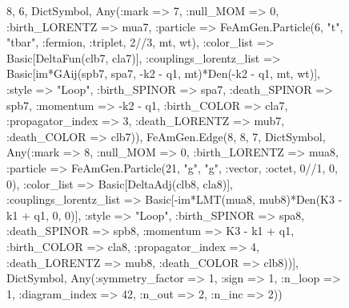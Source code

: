 \documentclass{revtex4}
\begin{document}
\begin{figure}[!htb]
\begin{center}
{8, 6, Dict{Symbol, Any}(:mark => 7, :null_MOM => 0, :birth_LORENTZ => mua7, :particle => FeAmGen.Particle(6, "t", "tbar", :fermion, :triplet, 2//3, mt, wt), :color_list => Basic[DeltaFun(clb7, cla7)], :couplings_lorentz_list => Basic[im*GAij(spb7, spa7, -k2 - q1, mt)*Den(-k2 - q1, mt, wt)], :style => "Loop", :birth_SPINOR => spa7, :death_SPINOR => spb7, :momentum => -k2 - q1, :birth_COLOR => cla7, :propagator_index => 3, :death_LORENTZ => mub7, :death_COLOR => clb7)), FeAmGen.Edge(8, 8, 7, Dict{Symbol, Any}(:mark => 8, :null_MOM => 0, :birth_LORENTZ => mua8, :particle => FeAmGen.Particle(21, "g", "g", :vector, :octet, 0//1, 0, 0), :color_list => Basic[DeltaAdj(clb8, cla8)], :couplings_lorentz_list => Basic[-im*LMT(mua8, mub8)*Den(K3 - k1 + q1, 0, 0)], :style => "Loop", :birth_SPINOR => spa8, :death_SPINOR => spb8, :momentum => K3 - k1 + q1, :birth_COLOR => cla8, :propagator_index => 4, :death_LORENTZ => mub8, :death_COLOR => clb8))], Dict{Symbol, Any}(:symmetry_factor => 1, :sign => 1, :n_loop => 1, :diagram_index => 42, :n_out => 2, :n_inc => 2)) 
}
\end{center}
\end{figure}
\end{document}
